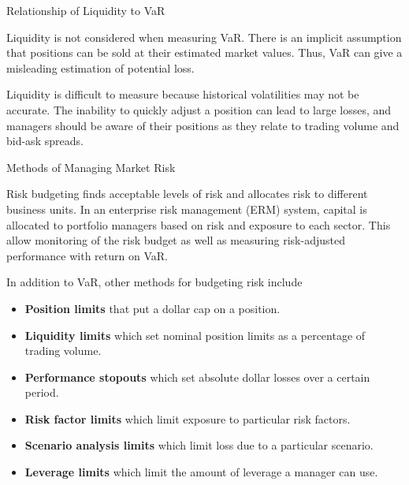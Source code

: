\documentclass[../custom]{flashcards}
\newcommand{\studyArea}{Risk Management}
\begin{document}
\begin{flashcard}[\studyArea]{Relationship of Liquidity to VaR}
    \begin{flushleft}
        Liquidity is not considered when measuring VaR. There is an implicit assumption that positions can be sold at their estimated market values. Thus, VaR can give a misleading estimation of potential loss.\newline

        Liquidity is difficult to measure because historical volatilities may not be accurate. The inability to quickly adjust a position can lead to large losses, and managers should be aware of their positions as they relate to trading volume and bid-ask spreads.
    \end{flushleft}
\end{flashcard}

\begin{flashcard}[\studyArea]{Methods of Managing Market Risk}
    \begin{flushleft}
        Risk budgeting finds acceptable levels of risk and allocates risk to different business units. In an enterprise risk management (ERM) system, capital is allocated to portfolio managers based on risk and exposure to each sector. This allow monitoring of the risk budget as well as measuring risk-adjusted performance with return on VaR.\newline

        In addition to VaR, other methods for budgeting risk include
        \begin{itemize}
            \item \textbf{Position limits} that put a dollar cap on a position.
            \item \textbf{Liquidity limits} which set nominal position limits as a percentage of trading volume.
            \item \textbf{Performance stopouts} which set absolute dollar losses over a certain period.
            \item \textbf{Risk factor limits} which limit exposure to particular risk factors.
            \item \textbf{Scenario analysis limits} which limit loss due to a particular scenario.
            \item \textbf{Leverage limits} which limit the amount of leverage a manager can use.
        \end{itemize}
    \end{flushleft}
\end{flashcard}
\end{document}
